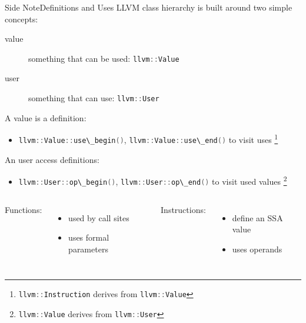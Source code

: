 \documentclass[10pt,mathserif]{beamer}
\newcommand{\cppinline}[1]{\lstinline[language=C++]!#1!}
\begin{document}
\begin{frame}{Side Note}{Definitions and Uses}
LLVM class hierarchy is built around two simple concepts:

\begin{description}
\item[value] something that can be used: \cppinline{llvm::Value}
\item[user] something that can use: \cppinline{llvm::User}
\end{description}

A value is a \alert{definition}:

\begin{itemize}
\item \cppinline{llvm::Value::use\_begin()},
      \cppinline{llvm::Value::use\_end()} to visit uses
      \footnote{\cppinline{llvm::Instruction} derives from \cppinline{llvm::Value}}
\end{itemize}

An user access \alert{definitions}:

\begin{itemize}
\item \cppinline{llvm::User::op\_begin()},
      \cppinline{llvm::User::op\_end()} to visit used values
      \footnote{\cppinline{llvm::Value} derives from \cppinline{llvm::User}}
\end{itemize}

\vfill
\begin{columns}[t]
Functions:

\begin{itemize}
\item used by call sites
\item uses formal parameters
\end{itemize}

Instructions:

\begin{itemize}
\item define an SSA value
\item uses operands
\end{itemize}
\end{columns}
\end{frame}
\end{document}
